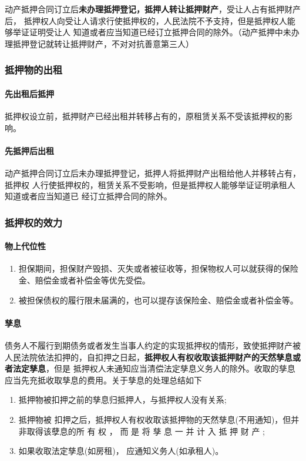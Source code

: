 \documentclass[UTF8,12pt]{ctexart}
\numberwithin{equation}{section} %
\numberwithin{figure}{section}
\numberwithin{table}{section}
\begin{document}
	动产抵押合同订立后\textbf{未办理抵押登记，抵押人转让抵押财产}，受让人占有抵押财产后， 抵押权人向受让人请求行使抵押权的，人民法院不予支持，但是抵押权人能够举证证明受让人 知道或者应当知道已经订立抵押合同的除外。（动产抵押中未办理抵押登记就转让抵押财产，不对对抗善意第三人）
	
	
	\subsubsection{抵押物的出租}
	
	\paragraph{先出租后抵押} 抵押权设立前，抵押财产已经出租并转移占有的，原租赁关系不受该抵押权的影响。
	
	\paragraph{先抵押后出租} 动产抵押合同订立后未办理抵押登记，抵押人将抵押财产出租给他人并移转占有，抵押权 人行使抵押权的，租赁关系不受影响，但是抵押权人能够举证证明承租人知道或者应当知道已 经订立抵押合同的除外。
	
	\subsubsection{抵押权的效力}
	
	\paragraph{物上代位性}
	\begin{enumerate}
		\item 担保期间，担保财产毁损、灭失或者被征收等，担保物权人可以就获得的保险金、赔偿金或者补偿金等优先受偿。
		
		\item 被担保债权的履行限未届满的，也可以提存该保险金、赔偿金或者补偿金等。
	\end{enumerate} 
	
	\paragraph{孳息} 债务人不履行到期债务或者发生当事人约定的实现抵押权的情形，致使抵押财产被人民法院依法扣押的，自扣押之日起，\textbf{抵押权人有权收取该抵押财产的天然孳息或者法定孳息}，但是 抵押权人未通知应当清偿法定孳息义务人的除外。收取的孳息应当先充抵收取孳息的费用。关于孳息的处理总结如下
	\begin{enumerate}
		\item 抵押物被扣押之前的孳息归抵押人，与抵押权人没有关系;
		
		\item 抵押物被 扣押之后，抵押权人有权收取该抵押物的天然孳息(不用通知)，但并非取得该孽息的所 有 权 ， 而 是 将 孳 息 一 并 计 入 抵 押 财 产 ; 
		
		\item 如果收取法定孳息(如房租)， 应通知义务人(如承租人)。
	\end{enumerate}
\end{document}

